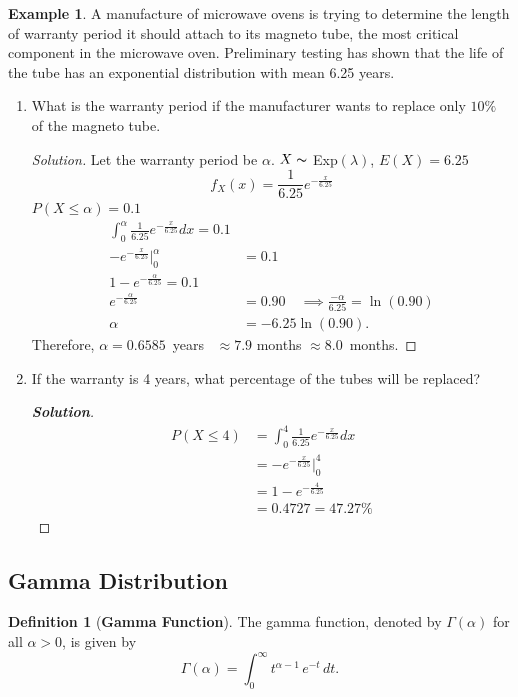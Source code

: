 \documentclass[12pt,a4paper]{report}
\theoremstyle{definition}
\newtheorem{definition}[thm]{Definition}
\newtheorem{example}[thm]{Example}
\theoremstyle{plain}
\theoremstyle{definition}
\begin{document}
\begin{example}
A manufacture of microwave ovens is trying to determine the length of warranty period it should attach to its magneto tube, the most critical component in the microwave oven. Preliminary testing has shown that the life of the tube has an exponential distribution with mean 6.25 years.
\begin{enumerate}
\item[(i).] What is the warranty period if the manufacturer wants to replace only $10\%$ of the magneto tube.
\begin{proof}[\textit{Solution}]
Let the warranty period be $\alpha$.
$X\thicksim $ Exp$(\lambda)$, $E(X)=6.25$
\[f_X(x)=\frac{1}{6.25}e^{-\frac{x}{6.25}}\]
$P(X\leq \alpha)=0.1$
\begin{align*}
\int^{\alpha}_0\frac{1}{6.25}e^{-\frac{x}{6.25}}dx=0.1\\
 -e^{-\frac{x}{6.25}}\Bigg|_0^{\alpha} &=0.1\\
1-e^{-\frac{\alpha}{6.25}}=0.1\\ e^{-\frac{\alpha}{6.25}} &=0.90\quad  \implies\frac{-\alpha}{6.25}=\ln (0.90)\\ \alpha &=-6.25 \ln (0.90).
\end{align*}
Therefore, $\alpha =0.6585$\, years \, $\approx 7.9$ months $\approx 8.0$\,  months.
\end{proof}


\item[(ii).] If the warranty is 4 years, what percentage of the tubes will be replaced?
\begin{proof}[\textbf{\textit{Solution}}]
\begin{align*}
P(X\leq 4) &=\int^4_0\frac{1}{6.25}e^{-\frac{x}{6.25}}dx\\
& =-e^{-\frac{x}{6.25}}\Big|_0^4\\
& = 1-e^{-\frac{4}{6.25}}\\
& = 0.4727 = 47.27\%
\end{align*}
\end{proof}
\end{enumerate}
\end{example}







\subsection{Gamma Distribution}
\begin{definition}[\textbf{Gamma Function}]
The gamma function, denoted by $\Gamma(\alpha)$  for all $\alpha > 0$, is given by \[\Gamma(\alpha) = \int_0^{\infty} t^{\alpha - 1}\, e^{-t}\, dt.\]
\end{definition}
\end{document}
